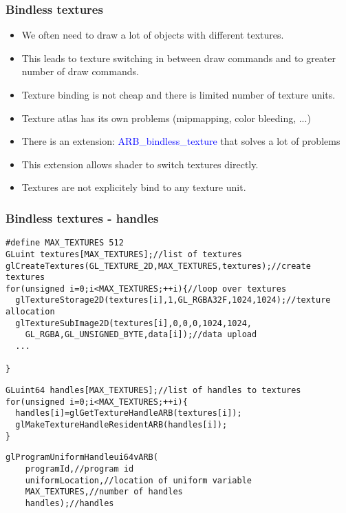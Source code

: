 
\begin{frame}[fragile]
\frametitle{Bindless textures}
  \begin{itemize}
    \item We often need to draw a lot of objects with different textures.
    \item This leads to texture switching in between draw commands and to greater number of draw commands.
    \item Texture binding is not cheap and there is limited number of texture units.
    \item Texture atlas has its own problems (mipmapping, color bleeding, ...)
    \item There is an extension: \textcolor{blue}{ARB\_bindless\_texture} that solves a lot of problems
    \item This extension allows shader to switch textures directly.
    \item Textures are not explicitely bind to any texture unit.
  \end{itemize}
\end{frame}

\begin{frame}[fragile]
\frametitle{Bindless textures - handles}
{\scriptsize
\begin{verbatim}
#define MAX_TEXTURES 512
GLuint textures[MAX_TEXTURES];//list of textures
glCreateTextures(GL_TEXTURE_2D,MAX_TEXTURES,textures);//create textures
for(unsigned i=0;i<MAX_TEXTURES;++i){//loop over textures
  glTextureStorage2D(textures[i],1,GL_RGBA32F,1024,1024);//texture allocation
  glTextureSubImage2D(textures[i],0,0,0,1024,1024,
    GL_RGBA,GL_UNSIGNED_BYTE,data[i]);//data upload
  ...
  
}
\end{verbatim}
}
{\scriptsize
\begin{verbatim}
GLuint64 handles[MAX_TEXTURES];//list of handles to textures
for(unsigned i=0;i<MAX_TEXTURES;++i){
  handles[i]=glGetTextureHandleARB(textures[i]);
  glMakeTextureHandleResidentARB(handles[i]);
}
\end{verbatim}
}
{\scriptsize
\begin{verbatim}
glProgramUniformHandleui64vARB(
    programId,//program id
    uniformLocation,//location of uniform variable
    MAX_TEXTURES,//number of handles
    handles);//handles
\end{verbatim}
}
\end{frame}

